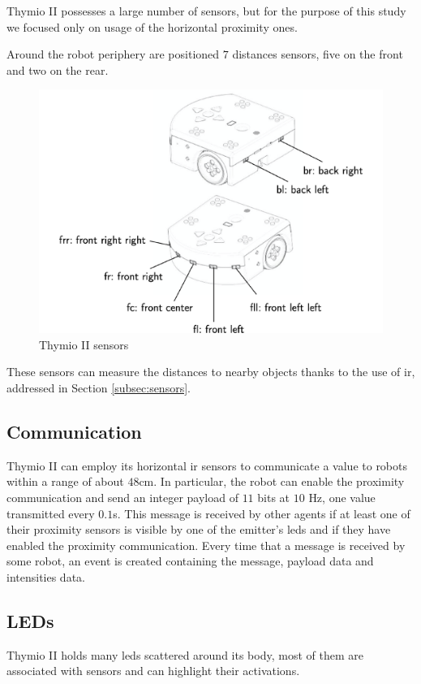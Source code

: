 Thymio II possesses a large number of sensors, but for the purpose of this 
study we focused only on usage of the horizontal proximity ones. 

Around the robot periphery are positioned $7$ distances sensors, five on the 
front and two on the rear. 
\begin{figure}[h!tb]
	\centering
	\includegraphics[width=.6\textwidth]{contents/images/thymio2x}
	\caption{Thymio II sensors}
	\label{fig:thymio sensors}
\end{figure}
These sensors can measure the distances to nearby objects thanks to the use 
of  \gls{ir}, addressed in Section \ref{subsec:sensors}.

\subsection{Communication}
\label{subsec:thymiocomm}

Thymio II can employ its horizontal \gls{ir} sensors to communicate a value 
to robots within a range of about $48$\gls{cm}. 
In particular, the robot can enable the proximity communication and send an 
integer payload of $11$ bits at $10$ \gls{Hz}, one value transmitted every 
$0.1$\gls{s}. 
This message is received by other agents if at least one of their proximity sensors 
is visible by one of the emitter’s \glspl{led} and if they have enabled the proximity 
communication.
Every time that a message is received by some robot, an event is 
created containing the message, payload data and intensities data.

\subsection{LEDs}
\label{subsec:thymioled}

Thymio II holds many \glspl{led} scattered around its body, most of them are 
associated 
with sensors and can highlight their activations.


